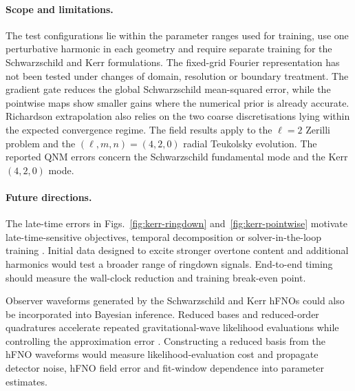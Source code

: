 \paragraph{Scope and limitations.}
The test configurations lie within the parameter ranges used for
training, use one perturbative harmonic in each geometry and require
separate training for the Schwarzschild and Kerr formulations. The
fixed-grid Fourier representation has not been tested under
changes of domain, resolution or boundary treatment. The
gradient gate reduces the global Schwarzschild mean-squared error,
while the pointwise maps show smaller gains where the numerical prior
is already accurate.
Richardson extrapolation also relies on the two coarse
discretisations lying within the expected convergence regime.
The field results apply to the $\ell=2$ Zerilli problem and the
$(\ell,m,n)=(4,2,0)$ radial Teukolsky evolution. The reported QNM
errors concern the Schwarzschild fundamental mode and the Kerr
$(4,2,0)$ mode.

\paragraph{Future directions.}
The late-time errors in Figs.~\ref{fig:kerr-ringdown}
and~\ref{fig:kerr-pointwise} motivate late-time-sensitive objectives,
temporal decomposition or solver-in-the-loop training
\citep{Um2020solverloop,Wang2023longtime,McCabe2023stability}.
Initial data designed to excite stronger overtone content and
additional harmonics would test a broader range of ringdown signals.
End-to-end timing should measure the wall-clock reduction and training
break-even point.

Observer waveforms generated by the Schwarzschild and Kerr hFNOs
could also be incorporated into Bayesian inference. Reduced bases and
reduced-order quadratures
accelerate repeated gravitational-wave likelihood evaluations while
controlling the approximation error
\citep{Canizares2013roq,Canizares2015roq}. Constructing a reduced
basis from the hFNO waveforms would measure likelihood-evaluation cost
and propagate detector noise, hFNO field error and fit-window
dependence into parameter estimates.
